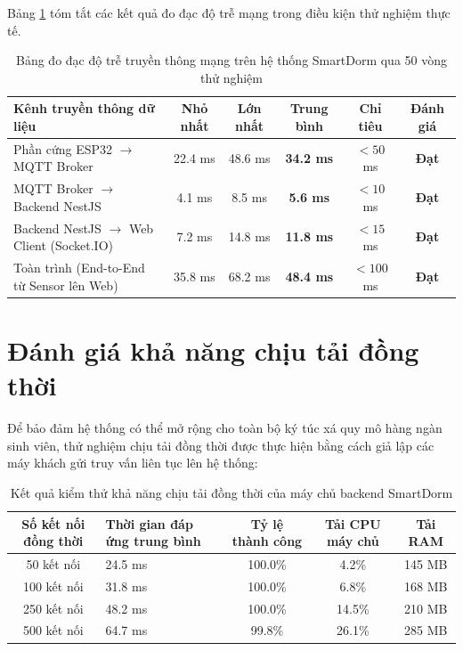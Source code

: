 Bảng \ref{tab:do_tre_mang} tóm tắt các kết quả đo đạc độ trễ mạng trong điều kiện thử nghiệm thực tế.

\begin{table}[H]
\centering
\footnotesize
\begin{tabularx}{\textwidth}{|X|c|c|c|c|c|}
\hline
\textbf{Kênh truyền thông dữ liệu} & \textbf{Nhỏ nhất} & \textbf{Lớn nhất} & \textbf{Trung bình} & \textbf{Chỉ tiêu} & \textbf{Đánh giá} \\
\hline
Phần cứng ESP32 $\rightarrow$ MQTT Broker & 22.4 ms & 48.6 ms & \textbf{34.2 ms} & $< 50$ ms & \textbf{Đạt} \\
\hline
MQTT Broker $\rightarrow$ Backend NestJS & 4.1 ms & 8.5 ms & \textbf{5.6 ms} & $< 10$ ms & \textbf{Đạt} \\
\hline
Backend NestJS $\rightarrow$ Web Client (Socket.IO) & 7.2 ms & 14.8 ms & \textbf{11.8 ms} & $< 15$ ms & \textbf{Đạt} \\
\hline
Toàn trình (End-to-End từ Sensor lên Web) & 35.8 ms & 68.2 ms & \textbf{48.4 ms} & $< 100$ ms & \textbf{Đạt} \\
\hline
\end{tabularx}
\caption{Bảng đo đạc độ trễ truyền thông mạng trên hệ thống SmartDorm qua 50 vòng thử nghiệm}
\label{tab:do_tre_mang}
\end{table}

\section{Đánh giá khả năng chịu tải đồng thời}
\label{sec:danh_gia_chiu_tai}

Để bảo đảm hệ thống có thể mở rộng cho toàn bộ ký túc xá quy mô hàng ngàn sinh viên, thử nghiệm chịu tải đồng thời được thực hiện bằng cách giả lập các máy khách gửi truy vấn liên tục lên hệ thống:

\begin{table}[H]
\centering
\footnotesize
\begin{tabularx}{\textwidth}{|c|X|c|c|c|}
\hline
\textbf{Số kết nối đồng thời} & \textbf{Thời gian đáp ứng trung bình} & \textbf{Tỷ lệ thành công} & \textbf{Tải CPU máy chủ} & \textbf{Tải RAM} \\
\hline
50 kết nối & 24.5 ms & 100.0\% & 4.2\% & 145 MB \\
\hline
100 kết nối & 31.8 ms & 100.0\% & 6.8\% & 168 MB \\
\hline
250 kết nối & 48.2 ms & 100.0\% & 14.5\% & 210 MB \\
\hline
500 kết nối & 64.7 ms & 99.8\% & 26.1\% & 285 MB \\
\hline
\end{tabularx}
\caption{Kết quả kiểm thử khả năng chịu tải đồng thời của máy chủ backend SmartDorm}
\label{tab:kiem_thu_tai}
\end{table}

